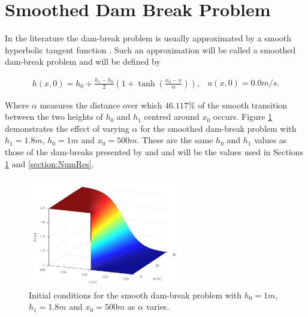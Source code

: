 \documentclass[times]{elsarticle}
\begin{document}
\section{Smoothed Dam Break Problem}
\label{section:smootheddambreak}
In the literature the dam-break problem is usually approximated by a smooth hyperbolic tangent function \cite{Mitsotakis-etal-2014,Mitsotakis-etal-2017}. Such an approximation will be called a smoothed dam-break problem and will be defined by
\begin{linenomath*}
\begin{subequations}
\begin{gather}
h(x,0) = h_0 + \frac{h_1 - h_0}{2}\left(1 + \tanh\left(\frac{x_0 - x}{\alpha}\right)\right),
\end{gather}
\begin{gather}
u(x,0) = 0.0m/s.
\end{gather}
\label{eq:sdbi}
\end{subequations}
\end{linenomath*}
Where $\alpha$ measures the distance over which $46.117\%$ of the smooth transition between the two heights of $h_0$ and $h_1$ centred around $x_0$ occurs. Figure \ref{fig:dbsmoothinit} demonstrates the effect of varying $\alpha$ for the smoothed dam-break problem with $h_1 =1.8m$, $h_0 = 1m$ and $x_0 = 500m$. These are the same $h_0$ and $h_1$ values as those of the dam-breaks presented by \cite{El-etal-2006} and \cite{Hank-etal-2010-2034} and will be the values used in Sections \ref{section:smootheddambreak} and \ref{section:NumRes}.
\begin{figure}
\centering
\includegraphics[width=0.6\textwidth]{pics/explainers/dbs.pdf}
\caption{Initial conditions for the smooth dam-break problem with $h_0 = 1m$, $h_1 = 1.8m$ and $x_0 =500m$ as $\alpha$ varies.}
\label{fig:dbsmoothinit}
\end{figure}
%
\end{document}

